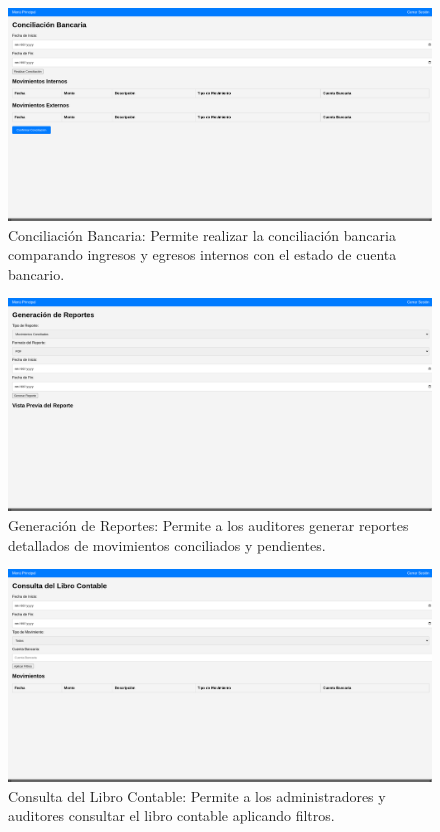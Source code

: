 \documentclass{article}
\begin{document}
\begin{figure}[H]
    \centering
    \includegraphics[width=\textwidth]{img/image6.png}
    \caption{Conciliación Bancaria: Permite realizar la conciliación bancaria comparando ingresos y egresos internos con el estado de cuenta bancario.}
\end{figure}

\begin{figure}[H]
    \centering
    \includegraphics[width=\textwidth]{img/image7.png}
    \caption{Generación de Reportes: Permite a los auditores generar reportes detallados de movimientos conciliados y pendientes.}
\end{figure}

\begin{figure}[H]
    \centering
    \includegraphics[width=\textwidth]{img/image8.png}
    \caption{Consulta del Libro Contable: Permite a los administradores y auditores consultar el libro contable aplicando filtros.}
\end{figure}
\end{document}
